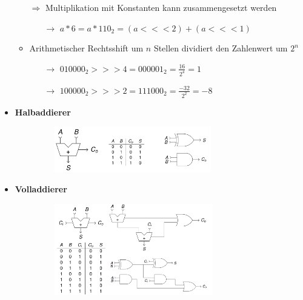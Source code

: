 \documentclass[11pt,a4paper]{article}
\begin{document}
\begin{itemize}
\begin{itemize}
	\item[$\Rightarrow$] Multiplikation mit Konstanten kann zusammengesetzt werden
		\begin{itemize}
		\item[$\rightarrow$] $a * 6 = a* 110_2 = (a <<< 2) + (a <<< 1)$
		\end{itemize}
	
	\item Arithmetischer Rechtsshift um $n$ Stellen dividiert den Zahlenwert um $2^n$
		\begin{itemize}
		\item[$\rightarrow$] $010000_2 >>> 4 = 000001_2 = \frac{16}{2^4} = 1$
		\item[$\rightarrow$] $100000_2 >>> 2 = 111000_2 = \frac{-32}{2^2} = -8$
		\end{itemize}
		
	\end{itemize}

\item \textbf{Halbaddierer}
	\begin{itemize}
	\item[]
		\begin{figure}[H]
			\begin{center}
			\includegraphics[height=2cm]{Bilder/halbaddierer}
			\end{center}
		\end{figure}
	\end{itemize}
	
\item \textbf{Volladdierer}
	\begin{itemize}
	\item[]
		\begin{figure}[H]
			\begin{center}
			\includegraphics[height=4cm]{Bilder/volladdierer}
			\end{center}
		\end{figure}
	\end{itemize}


\end{itemize}
\end{document}
